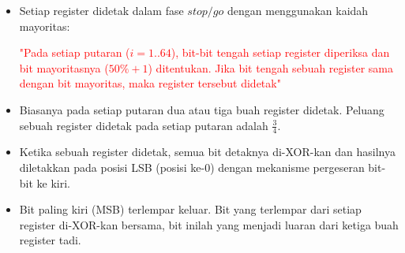 \documentclass{article}
\begin{document}

\begin{itemize}
    \item Setiap register didetak dalam fase $stop/go$ dengan menggunakan kaidah mayoritas:
    
    \textcolor{red}{"Pada setiap putaran ($i=1..64$), bit-bit tengah setiap register diperiksa dan bit mayoritasnya ($50\% + 1$) ditentukan. Jika bit tengah sebuah register sama dengan bit mayoritas, maka register tersebut didetak"}
    
    \item Biasanya pada setiap putaran dua atau tiga buah register didetak. Peluang sebuah register didetak pada setiap putaran adalah $\frac{3}{4}$.
    
    \item Ketika sebuah register didetak, semua bit detaknya di-XOR-kan dan hasilnya diletakkan pada posisi LSB (posisi ke-0) dengan mekanisme pergeseran bit-bit ke kiri.
    
    \item Bit paling kiri (MSB) terlempar keluar. Bit yang terlempar dari setiap register di-XOR-kan bersama, bit inilah yang menjadi luaran dari ketiga buah register tadi.
\end{itemize}
\end{document}
